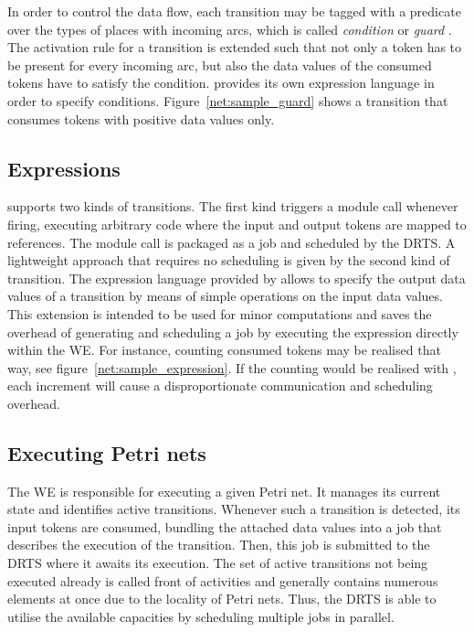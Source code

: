 In order to control the data flow, each transition may be tagged with a predicate over the types of places with incoming arcs, which is called \emph{condition} or \emph{guard} \cite{cp_nets}. The activation rule for a transition is extended such that not only a token has to be present for every incoming arc, but also the data values of the consumed tokens have to satisfy the condition. \gpispace{} provides its own expression language in order to specify conditions. Figure~\ref{net:sample_guard} shows a transition that consumes tokens with positive data values only.



\subsection*{Expressions}

\gpispace{} supports two kinds of transitions. The first kind triggers a module call whenever firing, executing arbitrary \cplusplus code where the input and output tokens are mapped to references. The module call is packaged as a job and scheduled by the \ac{DRTS}. A lightweight approach that requires no scheduling is given by the second kind of transition. The expression language provided by \gpispace{} allows to specify the output data values of a transition by means of simple operations on the input data values. This extension is intended to be used for minor computations and saves the overhead of generating and scheduling a job by executing the expression directly within the \ac{WE}. For instance, counting consumed tokens may be realised that way, see figure~\ref{net:sample_expression}. If the counting would be realised with \cplusplus, each increment will cause a disproportionate communication and scheduling overhead.



\subsection*{Executing Petri nets}

The \ac{WE} is responsible for executing a given Petri net. It manages its current state and identifies active transitions. Whenever such a transition is detected, its input tokens are consumed, bundling the attached data values into a job that describes the execution of the transition. Then, this job is submitted to the \ac{DRTS} where it awaits its execution. The set of active transitions not being executed already is called front of activities and generally contains numerous elements at once due to the locality of Petri nets. Thus, the \ac{DRTS} is able to utilise the available capacities by scheduling multiple jobs in parallel.

